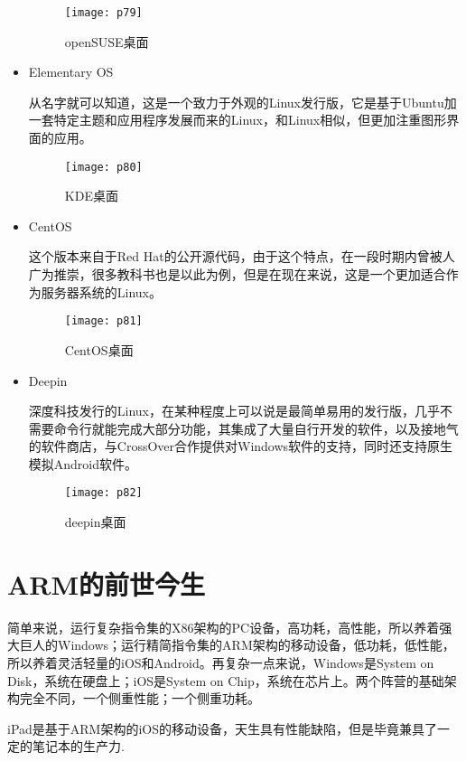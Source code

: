 \documentclass[utf8]{book}
\begin{document}
\begin{itemize}
	    \begin{figure}[H]
	    	\centering
	    	\texttt{[image: p79]}
	    	\caption{openSUSE桌面}
	    \end{figure}
	    \item Elementary OS
	    
	    从名字就可以知道，这是一个致力于外观的Linux发行版，它是基于Ubuntu加一套特定主题和应用程序发展而来的Linux，和Linux相似，但更加注重图形界面的应用。
	    
	    \begin{figure}[H]
	    	\centering
	    	\texttt{[image: p80]}
	    	\caption{KDE桌面}
	    \end{figure}
	    \item CentOS
	    
	    这个版本来自于Red Hat的公开源代码，由于这个特点，在一段时期内曾被人广为推崇，很多教科书也是以此为例，但是在现在来说，这是一个更加适合作为服务器系统的Linux。
	    \begin{figure}[H]
	    	\centering
	    	\texttt{[image: p81]}
	    	\caption{CentOS桌面}
	    \end{figure}
	    \item Deepin
	    
	    深度科技发行的Linux，在某种程度上可以说是最简单易用的发行版，几乎不需要命令行就能完成大部分功能，其集成了大量自行开发的软件，以及接地气的软件商店，与CrossOver合作提供对Windows软件的支持，同时还支持原生模拟Android软件。
	    
	    \begin{figure}[H]
	    	\centering
	    	\texttt{[image: p82]}
	    	\caption{deepin桌面}
	    \end{figure}
	 \end{itemize}

\section{ARM的前世今生}

	简单来说，运行复杂指令集的X86架构的PC设备，高功耗，高性能，所以养着强大巨人的Windows；运行精简指令集的ARM架构的移动设备，低功耗，低性能，所以养着灵活轻量的iOS和Android。再复杂一点来说，Windows是System on Disk，系统在硬盘上；iOS是System on Chip，系统在芯片上。两个阵营的基础架构完全不同，一个侧重性能；一个侧重功耗。

	iPad是基于ARM架构的iOS的移动设备，天生具有性能缺陷，但是毕竟兼具了一定的笔记本的生产力.
\end{document}

